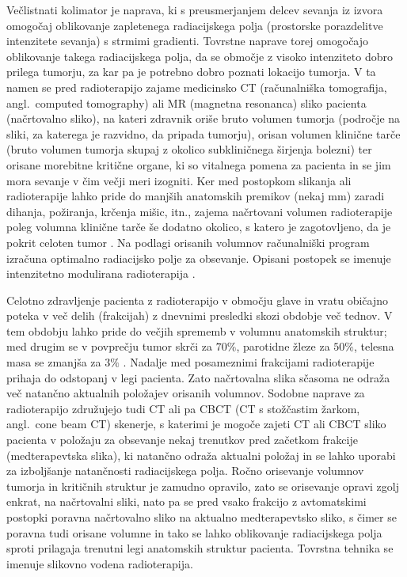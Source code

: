 \documentclass[journal]{IEEEtran}
\begin{document}
Večlistnati kolimator je naprava, ki s preusmerjanjem delcev sevanja iz izvora omogočaj oblikovanje zapletenega radiacijskega polja (prostorske porazdelitve intenzitete sevanja) s strmimi gradienti. Tovrstne naprave torej omogočajo oblikovanje takega radiacijskega polja, da se območje z visoko intenziteto dobro prilega tumorju, za kar pa je potrebno dobro poznati lokacijo tumorja. V ta namen se pred radioterapijo zajame medicinsko CT (računalniška tomografija, angl.~computed tomography) ali MR (magnetna resonanca) sliko pacienta (načrtovalno sliko), na kateri zdravnik oriše bruto volumen tumorja (področje na sliki, za katerega je razvidno, da pripada tumorju), orisan volumen klinične tarče (bruto volumen tumorja skupaj z okolico subkliničnega širjenja bolezni) ter orisane morebitne kritične organe, ki so vitalnega pomena za pacienta in se jim mora sevanje v čim večji meri izogniti. Ker med postopkom slikanja ali radioterapije lahko pride do manjših anatomskih premikov (nekaj mm) zaradi dihanja, požiranja, krčenja mišic, itn., zajema načrtovani volumen radioterapije poleg volumna klinične tarče še dodatno okolico, s katero je zagotovljeno, da je pokrit celoten tumor \cite{burnet2004}. Na podlagi orisanih volumnov računalniški program izračuna optimalno radiacijsko polje za obsevanje. Opisani postopek se imenuje intenzitetno modulirana radioterapija \cite{jaffray2012}.

Celotno zdravljenje pacienta z radioterapijo v območju glave in vratu običajno poteka v več delih (frakcijah) z dnevnimi presledki skozi obdobje več tednov. V tem obdobju lahko pride do večjih sprememb v volumnu anatomskih struktur; med drugim se v povprečju tumor skrči za $70\%$, parotidne žleze za $50\%$, telesna masa se zmanjša za $3\%$ \cite{al-mayah2015}. Nadalje med posameznimi frakcijami radioterapije prihaja do odstopanj v legi pacienta. Zato načrtovalna slika sčasoma ne odraža več natančno aktualnih položajev orisanih volumnov. Sodobne naprave za radioterapijo združujejo tudi CT ali pa CBCT (CT s stožčastim žarkom, angl.~cone beam CT) skenerje, s katerimi je mogoče zajeti CT ali CBCT sliko pacienta v položaju za obsevanje nekaj trenutkov pred začetkom frakcije (medterapevtska slika), ki natančno odraža aktualni položaj in se lahko uporabi za izboljšanje natančnosti radiacijskega polja. Ročno orisevanje volumnov tumorja in kritičnih struktur je zamudno opravilo, zato se orisevanje opravi zgolj enkrat, na načrtovalni sliki, nato pa se pred vsako frakcijo z avtomatskimi postopki poravna načrtovalno sliko na aktualno medterapevtsko sliko, s čimer se poravna tudi orisane volumne in tako se lahko oblikovanje radiacijskega polja sproti prilagaja trenutni legi anatomskih struktur pacienta. Tovrstna tehnika se imenuje slikovno vodena radioterapija.
\end{document}
